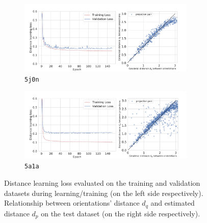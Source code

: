 \begin{figure}
    \centering
    \begin{subfigure}[t]{0.45\linewidth}
        \includegraphics[height=3.5cm]{figures/de_loss_dPdQ_5j0n.pdf}
        \caption{\texttt{5j0n}}
        \label{fig:losses-siamese-assym}
    \end{subfigure} \quad \quad
    \begin{subfigure}[t]{0.5\linewidth}
        \includegraphics[height=3.5cm]{figures/de_loss_dPdQ_5a1a.pdf}
        \caption{\texttt{5a1a}}
        \label{fig:losses-siamese-sym}
    \end{subfigure}
    \caption{
        Distance learning loss  evaluated on the training and validation datasets during learning/training (on the left side respectively). Relationship between orientations' distance $d_q$ and estimated distance $d_p$ on the test dataset (on the right side respectively).
    }\label{fig:losses-siamese}
\end{figure}


